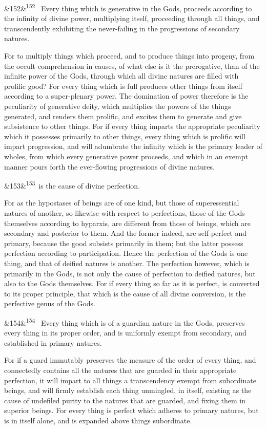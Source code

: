 \documentclass[12pt]{article}
\newcommand{\para}[1][]{\par\noindent\ifx&#1&\else\textsuperscript{\footnotesize #1}~\fi}
\begin{document}
\para[152] Every thing which is generative in the Gods, proceeds according to the infinity of divine power, multiplying itself, proceeding through all things, and transcendently exhibiting the never-failing in the progressions of secondary natures.

For to multiply things which proceed, and to produce things into progeny, from the occult comprehension in causes, of what else is it the prerogative, than of the infinite power of the Gods, through which all divine natures are filled with prolific good? For every thing which is full produces other things from itself according to a super-plenary power. The domination of power therefore is the peculiarity of generative deity, which multiplies the powers of the things generated, and renders them prolific, and excites them to generate and give subsistence to other things. For if every thing imparts the appropriate peculiarity which it possesses primarily to other things, every thing which is prolific will impart progression, and will adumbrate the infinity which is the primary leader of wholes, from which every generative power proceeds, and which in an exempt manner pours forth the ever-flowing progressions of divine natures.

\para[153] [Every thing which is perfect in the Gods,] is the cause of divine perfection.

For as the hypostases of beings are of one kind, but those of superessential natures of another, so likewise with respect to perfections, those of the Gods themselves according to hyparxis, are different from those of beings, which are secondary and posterior to them. And the former indeed, are self-perfect and primary, because the good subsists primarily in them; but the latter possess perfection according to participation. Hence the perfection of the Gods is one thing, and that of deified natures is another. The perfection however, which is primarily in the Gods, is not only the cause of perfection to deified natures, but also to the Gods themselves. For if every thing so far as it is perfect, is converted to its proper principle, that which is the cause of all divine conversion, is the perfective genus of the Gods.

\para[154] Every thing which is of a guardian nature in the Gods, preserves every thing in its proper order, and is uniformly exempt from secondary, and established in primary natures.

For if a guard immutably preserves the measure of the order of every thing, and connectedly contains all the natures that are guarded in their appropriate perfection, it will impart to all things a transcendency exempt from subordinate beings, and will firmly establish each thing unmingled, in itself, existing as the cause of undefiled purity to the natures that are guarded, and fixing them in superior beings. For every thing is perfect which adheres to primary natures, but is in itself alone, and is expanded above things subordinate.
\end{document}

